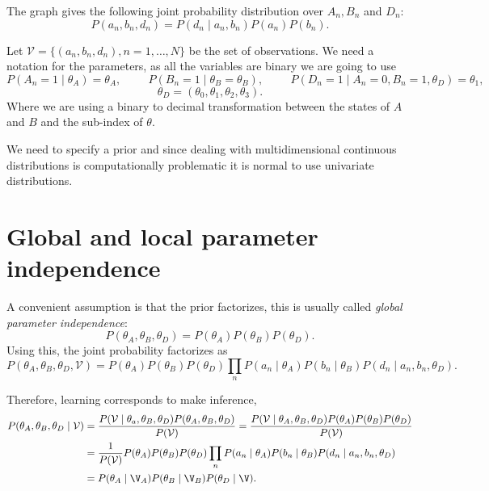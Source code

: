 The graph gives the following joint probability distribution over \(A_{n}, B_{n}\) and \(D_{n}\):
\[
P(a_{n},b_{n},d_{n}) = P(d_{n}\mid a_{n},b_{n})P(a_{n})P(b_{n}).
\]

Let \(\mathcal{V} = \{(a_{n}, b_{n}, d_{n}), n = 1,\dots , N\}\) be the set of observations. We need a notation for the parameters, as all the variables are binary we are
going to use
\[
  P(A_{n} = 1 \mid \theta_{A}) = \theta_{A}, \hspace{1cm} P(B_{n} = 1 \mid \theta_{B} = \theta_{B}), \hspace{1cm} P(D_{n} = 1 \mid A_{n} = 0, B_{n} = 1, \theta_{D}) = \theta_{1},
\]
\[
  \theta_{D} = ( \theta_{0}, \theta_{1}, \theta_{2},\theta_{3}).
\]
Where we are using a binary to decimal transformation between the states of \(A\) and \(B\) and the sub-index of \(\theta\).

We need to specify a prior and since dealing with multidimensional continuous
distributions is computationally problematic it is normal to use univariate
distributions.

\section{Global and local parameter independence}

A convenient assumption is that the prior factorizes, this is usually called
\emph{global parameter independence}:
\[
  P(\theta_{A}, \theta_{B}, \theta_{D}) = P(\theta_{A})P(\theta_{B})P(\theta_{D}).
\]
Using this, the joint probability factorizes as
\[
  P(\theta_{A}, \theta_{B}, \theta_{D}, \mathcal{V}) = P(\theta_{A})P(\theta_{B})P(\theta_{D})\prod_{n}P(a_{n}\mid \theta_{A})P(b_{n} \mid \theta_{B})P(d_{n}\mid a_{n}, b_{n}, \theta_{D}).
\]

Therefore, learning corresponds to make inference,
\[
  \begin{aligned}
    P(\theta_{A}, \theta_{B}, \theta_{D}\mid \mathcal{V}) &= \frac{P(\mathcal{V} \mid \theta_{a}, \theta_{B}, \theta_{D})P(\theta_{A}, \theta_{B}, \theta_{D})}{P(\mathcal{V})} =\frac{P(\mathcal{V} \mid \theta_{A}, \theta_{B}, \theta_{D})P(\theta_{A}) P(\theta_{B})P( \theta_{D})}{P(\mathcal{V})}\\
    &= \frac{1}{P(\mathcal{V})}P(\theta_{A})P(\theta_{B})P(\theta_{D})\prod_{n}P(a_{n}\mid \theta_{A})P(b_{n}\mid \theta_{B})P(d_{n}\mid a_{n}, b_{n},\theta_{D})\\
    &= P(\theta_{A} \mid \V_{A} )P(\theta_{B}\mid \V_{B})P(\theta_{D} \mid \V).
  \end{aligned}
\]

